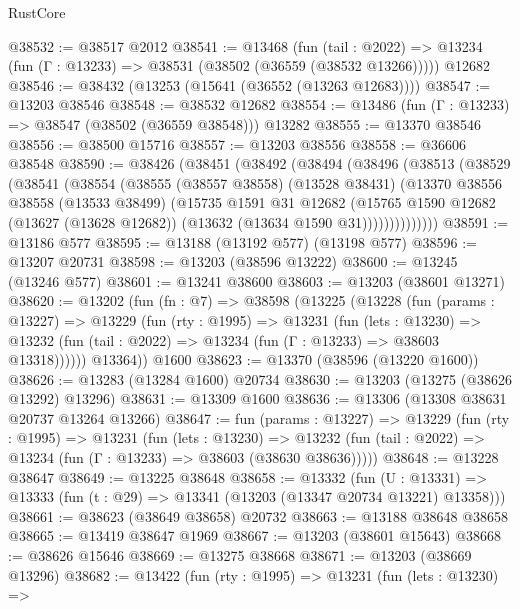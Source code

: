 \begin{lexlean}{RustCore}
\begin{coremodule}
@38532 := @38517 @2012
@38541 := @13468
    (fun (tail : @2022) => @13234 (fun (Γ : @13233) => @38531 (@38502 (@36559 (@38532 @13266)))))
    @12682
@38546 := @38432 (@13253 (@15641 (@36552 (@13263 @12683))))
@38547 := @13203 @38546
@38548 := @38532 @12682
@38554 := @13486 (fun (Γ : @13233) => @38547 (@38502 (@36559 @38548))) @13282
@38555 := @13370 @38546
@38556 := @38500 @15716
@38557 := @13203 @38556
@38558 := @36606 @38548
@38590 := @38426
    (@38451
      (@38492
        (@38494
          (@38496
            (@38513
              (@38529
                (@38541
                  (@38554
                    (@38555
                      (@38557 @38558)
                      (@13528 @38431)
                      (@13370
                        @38556
                        @38558
                        (@13533 @38499)
                        (@15735
                          @1591
                          @31
                          @12682
                          (@15765
                            @1590
                            @12682
                            (@13627 (@13628 @12682))
                            (@13632 (@13634 @1590 @31))))))))))))))
@38591 := @13186 @577
@38595 := @13188 (@13192 @577) (@13198 @577)
@38596 := @13207 @20731
@38598 := @13203 (@38596 @13222)
@38600 := @13245 (@13246 @577)
@38601 := @13241 @38600
@38603 := @13203 (@38601 @13271)
@38620 := @13202
    (fun (fn : @7) =>
    @38598
      (@13225
        (@13228
          (fun (params : @13227) =>
          @13229
            (fun (rty : @1995) =>
            @13231
              (fun (lets : @13230) =>
              @13232 (fun (tail : @2022) => @13234 (fun (Γ : @13233) => @38603 @13318))))))
        @13364))
    @1600
@38623 := @13370 (@38596 (@13220 @1600))
@38626 := @13283 (@13284 @1600) @20734
@38630 := @13203 (@13275 (@38626 @13292) @13296)
@38631 := @13309 @1600
@38636 := @13306 (@13308 @38631 @20737 @13264 @13266)
@38647 := fun (params : @13227) =>
  @13229
    (fun (rty : @1995) =>
    @13231
      (fun (lets : @13230) =>
      @13232 (fun (tail : @2022) => @13234 (fun (Γ : @13233) => @38603 (@38630 @38636)))))
@38648 := @13228 @38647
@38649 := @13225 @38648
@38658 := @13332
    (fun (U : @13331) => @13333 (fun (t : @29) => @13341 (@13203 (@13347 @20734 @13221) @13358)))
@38661 := @38623 (@38649 @38658) @20732
@38663 := @13188 @38648 @38658
@38665 := @13419 @38647 @1969
@38667 := @13203 (@38601 @15643)
@38668 := @38626 @15646
@38669 := @13275 @38668
@38671 := @13203 (@38669 @13296)
@38682 := @13422
    (fun (rty : @1995) =>
    @13231
      (fun (lets : @13230) =>

\end{coremodule}
\end{lexlean}
